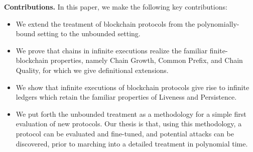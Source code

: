 \noindent
\textbf{Contributions.}
In this paper, we make the following key contributions:
\begin{itemize}
  \item We extend the treatment of blockchain protocols from the
        polynomially-bound setting to the unbounded setting.
  \item We prove that chains in infinite executions realize the familiar
        finite-blockchain properties, namely Chain Growth, Common Prefix, and
        Chain Quality, for which we give definitional extensions.
  \item We show that infinite executions of blockchain protocols give rise to
        infinite ledgers which retain the familiar properties of Liveness and
        Persistence.
  \item We put forth the unbounded treatment as a methodology for a simple first
        evaluation of new protocols. Our thesis is that, using this methodology,
        a protocol can be evaluated and fine-tuned, and potential attacks can be
        discovered, prior to marching into a detailed treatment in polynomial
        time.
\end{itemize}
